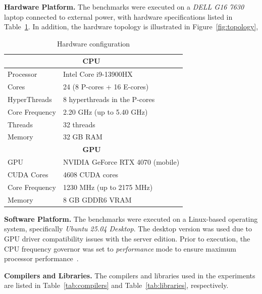 \documentclass[sigconf]{acmart}
\newcommand{\mypar}[1]{{\bf #1.}}
\begin{document}
\mypar{Hardware Platform}
The benchmarks were executed on a \textit{DELL G16 7630} laptop connected to external power,
with hardware specifications listed in Table~\ref{tab:hardware-config}.
In addition, the hardware topology is illustrated in Figure~\ref{fig:topology},

\begin{table}[H]
      \centering
      \caption{Hardware configuration}\label{tab:hardware-config}
      \begin{tabular}{|l|l|}
            \hline
            \multicolumn{2}{|c|}{\textbf{CPU}~\cite{cpu_specs}} \\
            \hline
            Processor      & Intel Core i9-13900HX              \\
            Cores          & 24 (8 P-cores + 16 E-cores)        \\
            HyperThreads   & 8 hyperthreads in the P-cores      \\
            Core Frequency & 2.20 GHz (up to 5.40 GHz)          \\
            Threads        & 32 threads                         \\
            Memory         & 32 GB RAM                          \\
            \hline
            \hline
            \multicolumn{2}{|c|}{\textbf{GPU}~\cite{gpu_specs}} \\
            \hline
            GPU            & NVIDIA GeForce RTX 4070 (mobile)   \\
            CUDA Cores     & 4608 CUDA cores                    \\
            Core Frequency & 1230 MHz (up to 2175 MHz)          \\
            Memory         & 8 GB GDDR6 VRAM                    \\
            \hline
      \end{tabular}
\end{table}

\mypar{Software Platform}
The benchmarks were executed on a Linux-based operating system, specifically \textit{Ubuntu 25.04 Desktop}.
The desktop version was used due to GPU driver compatibility issues with the server edition. Prior to execution,
the CPU frequency governor was set to \textit{performance} mode to ensure maximum processor performance~\cite{google_benchmark:governor}.

\mypar{Compilers and Libraries}
The compilers and libraries used in the experiments are listed in Table~\ref{tab:compilers} and Table~\ref{tab:libraries}, respectively.
\end{document}
